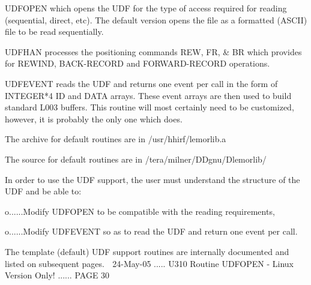    UDFOPEN  which  opens  the  UDF for the type of access required for reading
          (sequential, direct, etc). The default version opens the file  as  a
          formatted (ASCII) file to be read sequentially.
 
   UDFHAN  processes the positioning commands REW, FR, & BR which provides for
          REWIND, BACK-RECORD and FORWARD-RECORD operations.
 
   UDFEVENT reads the UDF and returns one  event  per  call  in  the  form  of
          INTEGER*4  ID  and  DATA arrays. These event arrays are then used to
          build standard L003 buffers. This routine will most  certainly  need
          to be customized, however, it is probably the only one which does.
 
   The archive for default routines are in /usr/hhirf/lemorlib.a
 
   The source  for default routines are in /tera/milner/DDgnu/Dlemorlib/
 
   In  order to use the UDF support, the user must understand the structure of
   the UDF and be able to:
 
   o......Modify UDFOPEN to be compatible with the reading requirements,
 
   o......Modify UDFEVENT so as to read the UDF and return one event per call.
 
 
   The template (default) UDF support routines are internally  documented  and
   listed on subsequent pages.
    
   24-May-05 ..... U310  Routine UDFOPEN - Linux Version Only! ...... PAGE  30
 
